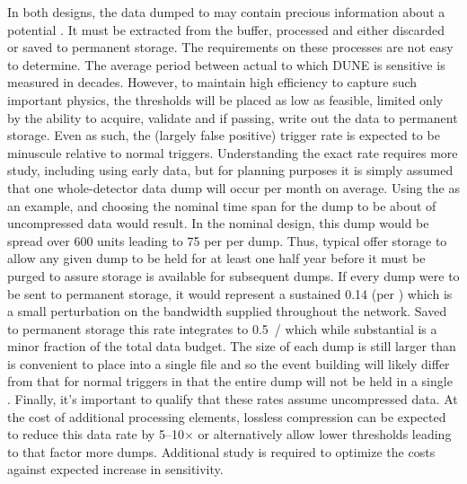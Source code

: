 In both designs, the data dumped to  may contain precious
information about a potential . 
It must be extracted from the buffer, processed and either discarded
or saved to permanent storage. 
The requirements on these processes are not easy to determine.
The average period between actual  to which DUNE is
sensitive is measured in decades. 
However, to maintain high efficiency to capture such important
physics, the thresholds will be placed as low as feasible, limited
only by the ability to acquire, validate and if passing, write out the
data to permanent storage. 
Even as such, the (largely false positive)  trigger rate is
expected to be minuscule relative to normal triggers.
Understanding the exact rate requires more study, including using
early data, but for planning purposes it is simply assumed that one
whole-detector data dump will occur per month on average.
Using the   as an example, and choosing the
nominal time span for the dump to be \snbtime about \spsnbsize of
uncompressed data would result.
In the nominal   design, this dump would be spread over
600  units leading to \SI{75}{\GB} per  per dump.
Thus, typical  offer storage to allow any given dump to be
held for at least one half year before it must be purged to assure
storage is available for subsequent dumps.
If every dump were to be sent to permanent storage, it would represent
a sustained \SI{0.14}{\Gbps} (per ) which is a small
perturbation on the bandwidth supplied throughout the  network. 
Saved to permanent storage this rate integrates to \SI{0.5}{\PB/\year}
which while substantial is a minor fraction of the total data budget.
The size of each dump is still larger than is convenient to place into
a single file and so the  event building will likely differ from
that for normal triggers in that the entire dump will not be held in a
single . 
Finally, it's important to qualify that these rates assume
uncompressed data. 
At the cost of additional processing elements, lossless compression
can be expected to reduce this data rate by 5--10$\times$ or
alternatively allow lower thresholds leading to that factor more
dumps.
Additional study is required to optimize the costs against expected
increase in sensitivity.


